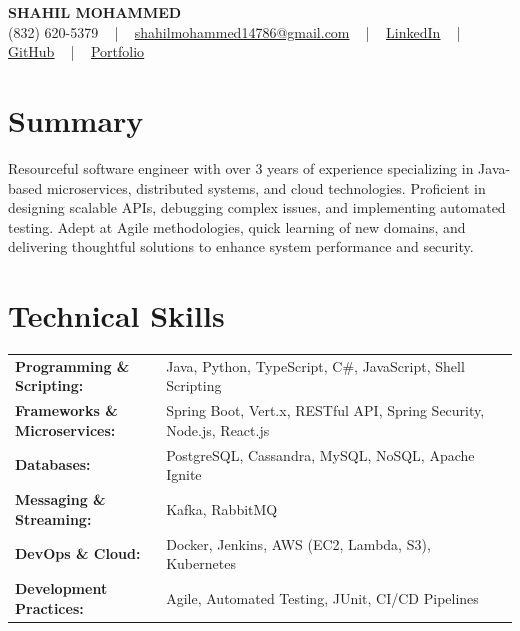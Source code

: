 \documentclass[letterpaper,11pt]{article}
\begin{document}
\begin{center}
    {\fontsize{14pt}{12pt}\selectfont \textbf{\MakeUppercase{Shahil Mohammed}}}\\ \vspace{2pt}
    \fontsize{10pt}{12pt}\selectfont (832) 620-5379 ~ | ~ \href{mailto:shahilmohammed14786@gmail.com}{shahilmohammed14786@gmail.com} ~ | ~  
    \href{https://www.linkedin.com/in/shahil-mohammed-9652931a1/}{\color{blue}\underline{LinkedIn}}  ~ | ~ 
    \href{https://github.com/freakbeast14}{\color{blue}\underline{GitHub}} ~ | ~ 
    \href{https://shahil-mohammed.netlify.app/}{\color{blue}\underline{Portfolio}}
    \vspace{-8pt}
\end{center}

\section{Summary}
\fontsize{9pt}{10pt}\selectfont
Resourceful software engineer with over 3 years of experience specializing in Java-based microservices, distributed systems, and cloud technologies. Proficient in designing scalable APIs, debugging complex issues, and implementing automated testing. Adept at Agile methodologies, quick learning of new domains, and delivering thoughtful solutions to enhance system performance and security.

 \vspace{-5pt}
 
\section{Technical Skills}
        \vspace{-14pt}
        \begin{table}[h]
            \fontsize{9pt}{10pt}\selectfont
            \begin{tabular}{p{0.3\linewidth} p{0.7\linewidth}}
                \textbf{Programming \& Scripting:} & Java, Python, TypeScript, C\#, JavaScript, Shell Scripting \\
                \textbf{Frameworks \& Microservices:} & Spring Boot, Vert.x, RESTful API, Spring Security, Node.js, React.js \\
                \textbf{Databases:} & PostgreSQL, Cassandra, MySQL, NoSQL, Apache Ignite \\
                \textbf{Messaging \& Streaming:} & Kafka, RabbitMQ \\
                \textbf{DevOps \& Cloud:} & Docker, Jenkins, AWS (EC2, Lambda, S3), Kubernetes \\
                \textbf{Development Practices:} & Agile, Automated Testing, JUnit, CI/CD Pipelines \\
            \end{tabular}
        \end{table}
 \vspace{-15pt}
 
\end{document}
